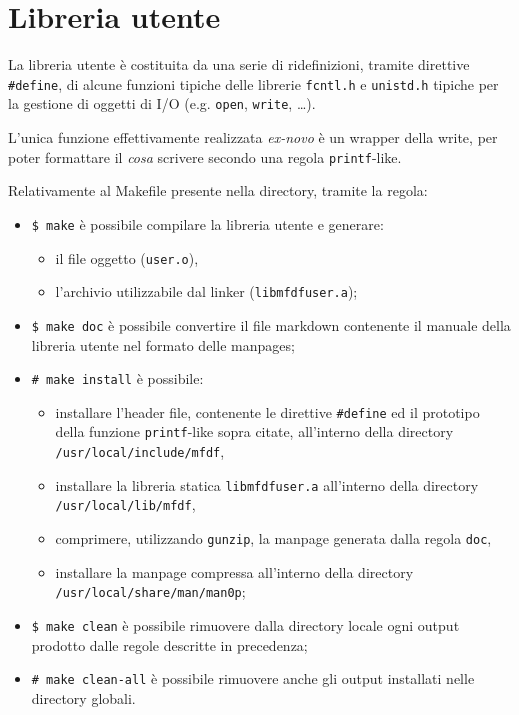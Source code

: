 \documentclass{article}
\newcommand{\terminal}[1]{\colorbox{tn-bg}{\textcolor{tn-fg}{\texttt{#1}}}}
\begin{document}
\section{Libreria utente}
La libreria utente è costituita da una serie di ridefinizioni, tramite direttive \texttt{\#define}, di alcune funzioni tipiche delle librerie \texttt{fcntl.h} e \texttt{unistd.h} tipiche per la gestione di oggetti di I/O (e.g. \texttt{open}, \texttt{write}, \dots).

L'unica funzione effettivamente realizzata \textit{ex-novo} è un wrapper della write, per poter formattare il \textit{cosa} scrivere secondo una regola \texttt{printf}-like.

Relativamente al Makefile presente nella directory, tramite la regola:
\begin{itemize}
        \item \terminal{\$ make} è possibile compilare la libreria utente e generare:
                \begin{itemize}
                        \item il file oggetto (\texttt{user.o}),
                        \item l'archivio utilizzabile dal linker (\texttt{libmfdfuser.a});
                \end{itemize}
        \item \terminal{\$ make doc} è possibile convertire il file markdown contenente il manuale della libreria utente nel formato delle manpages;
        \item \terminal{\# make install} è possibile:
                \begin{itemize}
                        \item installare l'header file, contenente le direttive \texttt{\#define} ed il prototipo della funzione \texttt{printf}-like sopra citate, all'interno della directory \texttt{/usr/local/include/mfdf},
                        \item installare la libreria statica \texttt{libmfdfuser.a} all'interno della directory \texttt{/usr/local/lib/mfdf},
                        \item comprimere, utilizzando \texttt{gunzip}, la manpage generata dalla regola \texttt{doc},
                        \item installare la manpage compressa all'interno della directory \texttt{/usr/local/share/man/man0p};
                \end{itemize}
        \item \terminal{\$ make clean} è possibile rimuovere dalla directory locale ogni output prodotto dalle regole descritte in precedenza;
        \item \terminal{\# make clean-all} è possibile rimuovere anche gli output installati nelle directory globali.
\end{itemize}
\end{document}
